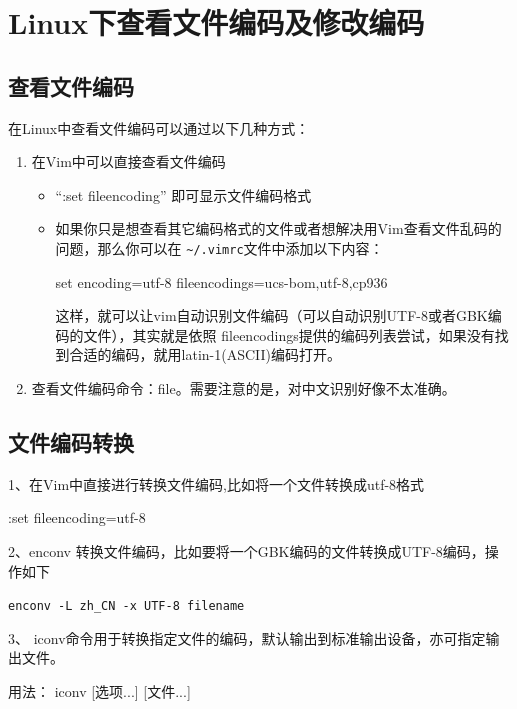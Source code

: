 {\section{Linux下查看文件编码及修改编码}
\subsection{查看文件编码}
在Linux中查看文件编码可以通过以下几种方式：
\begin{enumerate}
\item 在Vim中可以直接查看文件编码
\begin{itemize}
\item ``:set fileencoding'' 即可显示文件编码格式
\item 如果你只是想查看其它编码格式的文件或者想解决用Vim查看文件乱码的问题，那么你可以在
\verb|~/.vimrc|文件中添加以下内容：

set encoding=utf-8 fileencodings=ucs-bom,utf-8,cp936

这样，就可以让vim自动识别文件编码（可以自动识别UTF-8或者GBK编码的文件），其实就是依照 fileencodings提供的编码列表尝试，如果没有找到合适的编码，就用latin-1(ASCII)编码打开。
\end{itemize}


\item 查看文件编码命令：file。需要注意的是，对中文识别好像不太准确。
\end{enumerate}



\subsection{文件编码转换}
1、在Vim中直接进行转换文件编码,比如将一个文件转换成utf-8格式

:set fileencoding=utf-8

2、enconv 转换文件编码，比如要将一个GBK编码的文件转换成UTF-8编码，操作如下

\verb|enconv -L zh_CN -x UTF-8 filename|

3、 iconv命令用于转换指定文件的编码，默认输出到标准输出设备，亦可指定输出文件。  

用法： iconv [选项...] [文件...]  

}

